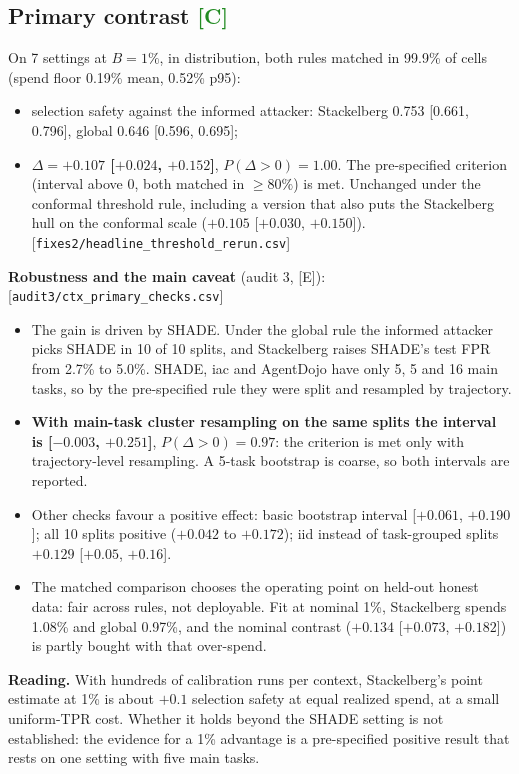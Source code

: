 \documentclass[11pt]{article}
\newcommand{\tC}{\textsf{\scriptsize\textcolor{ForestGreen}{[C]}}\xspace}
\newcommand{\tE}{\textsf{\scriptsize\textcolor{ink2}{[E]}}\xspace}
\newcommand{\src}[1]{{\footnotesize\textcolor{ink2}{[\nolinkurl{#1}]}}}
\begin{document}
\subsection{Primary contrast \tC}
On 7 settings at $B=1\%$, in distribution, both rules matched in 99.9\% of cells (spend floor 0.19\% mean, 0.52\% p95):
\begin{itemize}
\item selection safety against the informed attacker: Stackelberg 0.753 [0.661, 0.796], global 0.646 [0.596, 0.695];
\item \textbf{$\Delta=+0.107$ [$+0.024$, $+0.152$]}, $P(\Delta>0)=1.00$. The pre-specified criterion (interval above 0, both matched in $\ge80\%$) is met. Unchanged under the conformal threshold rule, including a version that also puts the Stackelberg hull on the conformal scale ($+0.105$ [$+0.030$, $+0.150$]).\src{fixes2/headline_threshold_rerun.csv}
\end{itemize}
\textbf{Robustness and the main caveat} (audit 3, \tE):\src{audit3/ctx_primary_checks.csv}
\begin{itemize}
\item The gain is driven by SHADE. Under the global rule the informed attacker picks SHADE in 10 of 10 splits, and Stackelberg raises SHADE's test FPR from 2.7\% to 5.0\%. SHADE, iac and AgentDojo have only 5, 5 and 16 main tasks, so by the pre-specified rule they were split and resampled by trajectory.
\item \textbf{With main-task cluster resampling on the same splits the interval is [$-0.003$, $+0.251$]}, $P(\Delta>0)=0.97$: the criterion is met only with trajectory-level resampling. A 5-task bootstrap is coarse, so both intervals are reported.
\item Other checks favour a positive effect: basic bootstrap interval [$+0.061$, $+0.190$]; all 10 splits positive ($+0.042$ to $+0.172$); iid instead of task-grouped splits $+0.129$ [$+0.05$, $+0.16$].
\item The matched comparison chooses the operating point on held-out honest data: fair across rules, not deployable. Fit at nominal 1\%, Stackelberg spends 1.08\% and global 0.97\%, and the nominal contrast ($+0.134$ [$+0.073$, $+0.182$]) is partly bought with that over-spend.
\end{itemize}
\textbf{Reading.} With hundreds of calibration runs per context, Stackelberg's point estimate at 1\% is about $+0.1$ selection safety at equal realized spend, at a small uniform-TPR cost. Whether it holds beyond the SHADE setting is not established: the evidence for a 1\% advantage is a pre-specified positive result that rests on one setting with five main tasks.
\end{document}
